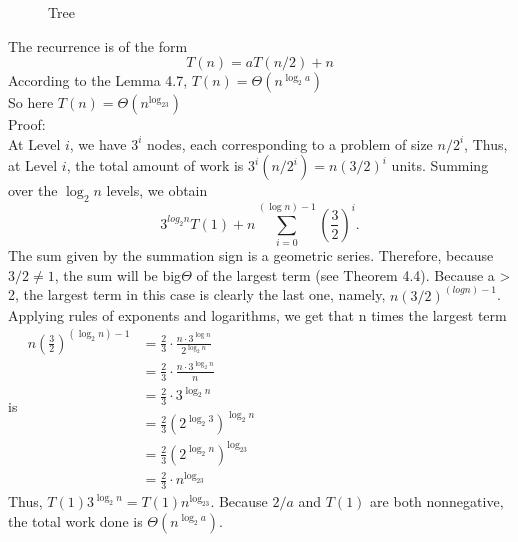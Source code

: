 \documentclass[a4paper, justified]{tufte-handout}
\begin{document}
\begin{solution}
  \begin{figure}[htb]
    \caption{\label{1} Tree}
  \end{figure}
  The recurrence is of the form
  $$T(n) = aT(n/2) + n$$
  According to the Lemma 4.7, $T(n) = \Theta (n^{\log _2a})$\\
  So here $T(n) = \Theta (n^{\log _23})$\\
  Proof:\\
  At Level $i$, we have $3^i$ nodes, each corresponding to a problem of size $n/2^i$, Thus, at Level $i$, the total amount of work is $3^i(n/2^i) = n(3/2)^i$ units. Summing over the $\log_2n$ levels, we obtain
  $$3^{log_2n}T(1)+n\sum ^{(\log n) - 1}_{i = 0}(\frac{3}{2})^i.$$
  The sum given by the summation sign is a geometric series. Therefore, because $3/2 \neq 1$, the sum will be big$\Theta$ of the largest term (see Theorem 4.4). Because a > 2, the largest term in this case is clearly the last one, namely, $n(3/2)^{(log n)−1}$. Applying rules of exponents and logarithms, we get that n times the largest term is
  $\begin{aligned}
      n\left(\frac{3}{2}\right)^{\left(\log _{2} n\right)-1} & =\frac{2}{3} \cdot \frac{n \cdot 3^{\log n}}{2^{\log _2n}} \\
                                                             & =\frac{2}{3} \cdot \frac{n \cdot 3^{\log _2n}}{n}          \\
                                                             & =\frac{2}{3} \cdot 3^{\log _2n}                            \\
                                                             & =\frac{2}{3}\left(2^{\log_2 3}\right)^{\log _2n}           \\
                                                             & =\frac{2}{3}\left(2^{\log _2n}\right)^{\log _23}           \\
                                                             & =\frac{2}{3} \cdot n^{\log _23}\end{aligned}$\\
  Thus, $T(1)3^{\log _2n} = T(1)n^{\log _23}$. Because $2/a$ and $T(1)$ are both nonnegative, the total work done is $\Theta(n^{\log _2 a})$.
\end{solution}
\end{document}
